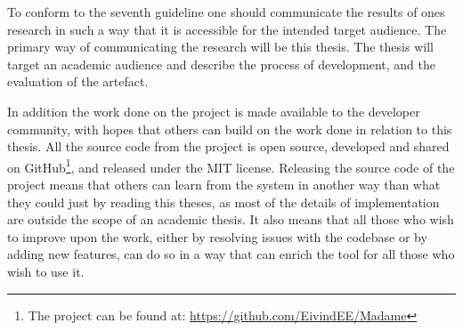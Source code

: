 To conform to the seventh guideline one should communicate the results of ones research in such a way that it is accessible for the intended target audience.
The primary way of communicating the research will be this thesis.
The thesis will target an academic audience and describe the process of development,
and the evaluation of the artefact.

In addition the work done on the project is made available to the developer community,
with hopes that others can build on the work done in relation to this thesis.
All the source code from the project is open source,
developed and shared on GitHub\footnote{The project can be found at: \url{https://github.com/EivindEE/Madame}},
and released under the MIT license.
Releasing the source code of the project means that others can learn from the system in another way than what they
could just by reading this theses, as most of the details of implementation are outside the scope of an academic thesis.
It also means that all those who wish to improve upon the work,
either by resolving issues with the codebase or by adding new features,
can do so in a way that can enrich the tool for all those who wish to use it.



